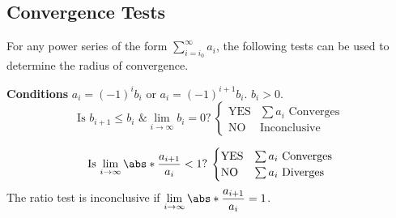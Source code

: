 \documentclass{article}
\begin{document}
\subsection{Convergence Tests}
For any power series of the form \(\displaystyle\sum_{i=i_0}^\infty
a_i\), the following tests can be used to determine the radius of
convergence.
\begin{tcolorboxlarge}[title={Alternating Series}]
    \textbf{Conditions} \(a_i = \left( -1 \right)^i b_i\) or
    \(a_i = \left( -1 \right)^{i+1} b_i\). \(b_i>0\).
    \begin{equation*}
        \text{Is \(b_{i+1}\leqslant b_i\) \& \(\lim_{i\to\infty}b_i=0\)?}\:
        \begin{cases}
            \text{YES} & \text{\(\sum a_i\) Converges} \\
            \text{NO}  & \text{Inconclusive}
        \end{cases}
    \end{equation*}
\end{tcolorboxlarge}
\begin{tcolorboxlarge}[title={Ratio Test}]
    \begin{equation*}
        \text{Is \(\lim_{i\to\infty}\abs*{\frac{a_{i+1}}{a_i}} < 1\)?}\:
        \begin{cases}
            \text{YES} & \text{\(\sum a_i\) Converges} \\
            \text{NO}  & \text{\(\sum a_i\) Diverges}
        \end{cases}
    \end{equation*}
    The ratio test is inconclusive if
    \(\displaystyle \lim_{i\to\infty}\abs*{\frac{a_{i+1}}{a_i}} = 1\).
\end{tcolorboxlarge}
\end{document}
